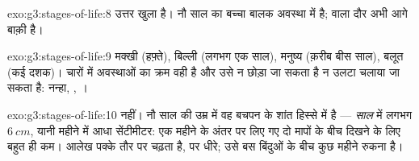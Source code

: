 \begin{solution}{exo:g3:stages-of-life:8}
उत्तर खुला है। नौ साल का बच्चा बालक अवस्था में है;  वाला दौर अभी
आगे बाक़ी है।
\end{solution}

\begin{solution}{exo:g3:stages-of-life:9}
मक्खी (हफ़्ते), बिल्ली (लगभग एक साल), मनुष्य (क़रीब बीस साल), बलूत (कई
दशक)। चारों में अवस्थाओं का क्रम वही है और उसे न छोड़ा जा सकता है न
उलटा चलाया जा सकता है: नन्हा, , ।
\end{solution}

\begin{solution}{exo:g3:stages-of-life:10}
नहीं। नौ साल की उम्र में वह बचपन के शांत हिस्से में है ---
\emph{साल} में लगभग $\qty{6}{cm}$, यानी महीने में आधा सेंटीमीटर: एक महीने के अंतर पर
लिए गए दो मापों के बीच दिखने के लिए बहुत ही कम। आलेख पक्के तौर पर
चढ़ता है, पर धीरे; उसे बस बिंदुओं के बीच कुछ महीने रुकना है।
\end{solution}
